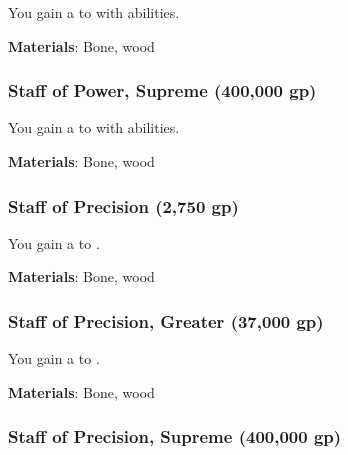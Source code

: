 You gain a   to  with  abilities.



\vspace{0.25em}
\textbf{Materials}: Bone, wood


\lowercase{\hypertarget{item:Staff of Power, Supreme}{}}\label{item:Staff of Power, Supreme}
\hypertarget{item:Staff of Power, Supreme}{\subsubsection{Staff of Power, Supreme\hfill{} (400,000 gp)}}

You gain a   to  with  abilities.



\vspace{0.25em}
\textbf{Materials}: Bone, wood


\lowercase{\hypertarget{item:Staff of Precision}{}}\label{item:Staff of Precision}
\hypertarget{item:Staff of Precision}{\subsubsection{Staff of Precision\hfill{} (2,750 gp)}}

You gain a   to .



\vspace{0.25em}
\textbf{Materials}: Bone, wood


\lowercase{\hypertarget{item:Staff of Precision, Greater}{}}\label{item:Staff of Precision, Greater}
\hypertarget{item:Staff of Precision, Greater}{\subsubsection{Staff of Precision, Greater\hfill{} (37,000 gp)}}

You gain a   to .



\vspace{0.25em}
\textbf{Materials}: Bone, wood


\lowercase{\hypertarget{item:Staff of Precision, Supreme}{}}\label{item:Staff of Precision, Supreme}
\hypertarget{item:Staff of Precision, Supreme}{\subsubsection{Staff of Precision, Supreme\hfill{} (400,000 gp)}}

